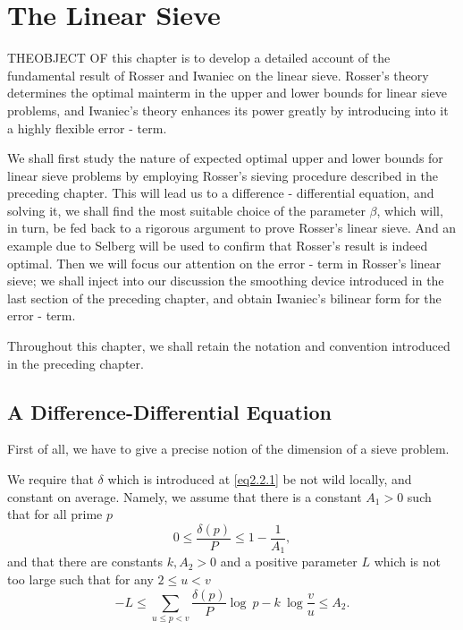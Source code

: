 \chapter{The Linear Sieve}\label{chap3} %

THE\pageoriginale OBJECT OF this chapter is to develop a detailed account of the
fundamental result of Rosser and Iwaniec on the linear sieve. Rosser's
theory determines the optimal mainterm in the upper and lower bounds
for linear sieve problems, and Iwaniec's theory enhances its power
grea\-tly by introducing into it a highly flexible error - term. 

We shall first study the nature of expected optimal upper and lower
bounds for linear sieve problems by employing Rosser's sieving
procedure described in the preceding chapter. This will lead us to a
difference - differential equation, and solving it, we shall find the
most suitable choice of the parameter $\beta$, which will, in turn, be
fed back to a rigorous argument to prove Rosser's linear sieve. And an
example due to Selberg will be used to confirm that Rosser's result is
indeed optimal. Then we will focus our attention on the error - term
in Rosser's linear sieve; we shall inject into our discussion the
smoothing device introduced in the last section of the preceding
chapter, and obtain Iwaniec's bilinear form for the error - term. 

Throughout this chapter, we shall retain the notation and convention
introduced in the preceding chapter. 

\section{A Difference-Differential Equation}\label{chap3-sec3.1}\pageoriginale %

First of all, we have to give a precise notion of the
dimension of a sieve problem. 

We require that $\delta$ which is introduced at \eqref{eq2.2.1} be not wild
locally, and constant on average. Namely, we assume that there is a
constant $A_1 > 0$ such that for all prime $p$  
\begin{equation*}
  0 \le \frac{\delta(p)}{P} \le 1 - \frac{1}{A_1}, \tag{3.1.1}\label{eq3.1.1}
\end{equation*}
and that there are constants $k, A_2 > 0$ and a positive parameter $L$
which is not too large such that for any $2 \le u < v$ 
$$
-L \le \sum_{u \le p < v} \frac{\delta(p)}{P} \log~ p - k~ \log
\frac{v}{u} \le A_2. 
$$

